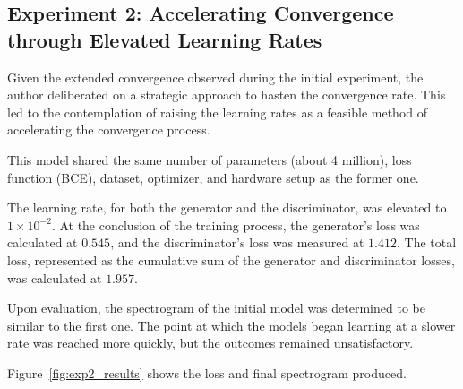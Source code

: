 \subsection{Experiment 2: Accelerating Convergence through Elevated Learning Rates} \label{sec:exp2}

Given the extended convergence observed during the initial experiment, the author deliberated on a strategic approach to hasten the convergence rate. This led to the contemplation of raising the learning rates as a feasible method of accelerating the convergence process.

This model shared the same number of parameters (about 4 million), loss function (\ac{BCE}), dataset, optimizer, and hardware setup as the former one.

The learning rate, for both the generator and the discriminator, was elevated to $1 \times 10^{-2}$. At the conclusion of the training process, the generator’s loss was calculated at $0.545$, and the discriminator’s loss was measured at $1.412$. The total loss, represented as the cumulative sum of the generator and discriminator losses, was calculated at $1.957$.

Upon evaluation, the spectrogram of the initial model was determined to be similar to the first one. The point at which the models began learning at a slower rate was reached more quickly, but the outcomes remained unsatisfactory.

Figure~\ref{fig:exp2_results} shows the loss and final spectrogram produced.

